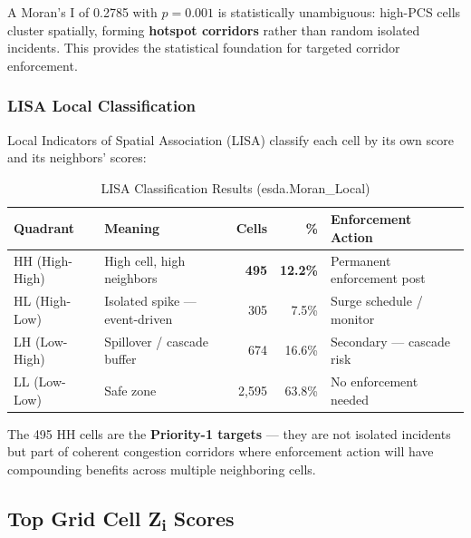 \documentclass[12pt,a4paper]{article}
\begin{document}
A Moran's I of 0.2785 with $p = 0.001$ is statistically unambiguous: high-PCS cells cluster spatially, forming \textbf{hotspot corridors} rather than random isolated incidents. This provides the statistical foundation for targeted corridor enforcement.

\subsubsection{LISA Local Classification}

Local Indicators of Spatial Association (LISA) classify each cell by its own score and its neighbors' scores:

\begin{table}[H]
\centering
\caption{LISA Classification Results (esda.Moran\_Local)}
\begin{tabular}{llrrl}
\toprule
\textbf{Quadrant} & \textbf{Meaning} & \textbf{Cells} & \textbf{\%} & \textbf{Enforcement Action} \\
\midrule
\rowcolor{alertred!10} HH (High-High) & High cell, high neighbors & \textbf{495} & \textbf{12.2\%} & Permanent enforcement post \\
\rowcolor{gold!10} HL (High-Low) & Isolated spike — event-driven & 305 & 7.5\% & Surge schedule / monitor \\
LH (Low-High) & Spillover / cascade buffer & 674 & 16.6\% & Secondary — cascade risk \\
\rowcolor{emerald!10} LL (Low-Low) & Safe zone & 2,595 & 63.8\% & No enforcement needed \\
\bottomrule
\end{tabular}
\end{table}

The 495 HH cells are the \textbf{Priority-1 targets} — they are not isolated incidents but part of coherent congestion corridors where enforcement action will have compounding benefits across multiple neighboring cells.

\subsection{Top Grid Cell Z\textsubscript{i} Scores}
\end{document}
